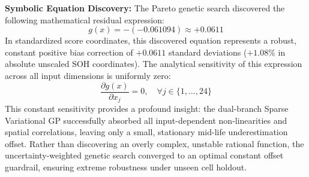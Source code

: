 \documentclass[a4paper,fleqn]{cas-sc}
\begin{document}
\textbf{Symbolic Equation Discovery:} The Pareto genetic search discovered the following mathematical residual expression:
\begin{equation}
    g(x) = -(-0.061094) \approx +0.0611
\end{equation}
In standardized score coordinates, this discovered equation represents a robust, constant positive bias correction of $+0.0611$ standard deviations ($+1.08\%$ in absolute unscaled SOH coordinates). The analytical sensitivity of this expression across all input dimensions is uniformly zero:
\begin{equation}
    \frac{\partial g(x)}{\partial x_j} = 0, \quad \forall j \in \{1, \dots, 24\}
\end{equation}
This constant sensitivity provides a profound insight: the dual-branch Sparse Variational GP successfully absorbed all input-dependent non-linearities and spatial correlations, leaving only a small, stationary mid-life underestimation offset. Rather than discovering an overly complex, unstable rational function, the uncertainty-weighted genetic search converged to an optimal constant offset guardrail, ensuring extreme robustness under unseen cell holdout.
\end{document}
